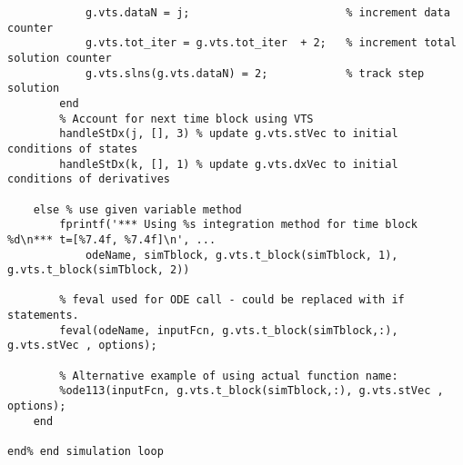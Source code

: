 \begin{verbatim}
            g.vts.dataN = j;                        % increment data counter
            g.vts.tot_iter = g.vts.tot_iter  + 2;   % increment total solution counter
            g.vts.slns(g.vts.dataN) = 2;            % track step solution
        end
        % Account for next time block using VTS
        handleStDx(j, [], 3) % update g.vts.stVec to initial conditions of states
        handleStDx(k, [], 1) % update g.vts.dxVec to initial conditions of derivatives 
        
    else % use given variable method
        fprintf('*** Using %s integration method for time block %d\n*** t=[%7.4f, %7.4f]\n', ...
            odeName, simTblock, g.vts.t_block(simTblock, 1), g.vts.t_block(simTblock, 2))
        
        % feval used for ODE call - could be replaced with if statements.
        feval(odeName, inputFcn, g.vts.t_block(simTblock,:), g.vts.stVec , options);
        
        % Alternative example of using actual function name:
        %ode113(inputFcn, g.vts.t_block(simTblock,:), g.vts.stVec , options);
    end
    
end% end simulation loop
\end{verbatim}